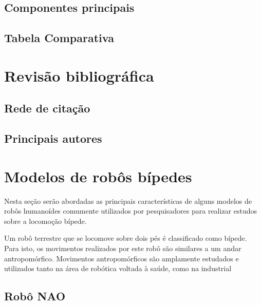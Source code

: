 \subsection{Componentes principais}
\label{ssec:comp}

\subsection{Tabela Comparativa}
\label{ssec:tabela}







\section{Revisão bibliográfica}
\label{sec:biblio}

\subsection{Rede de citação}
\label{ssec:rede}

\subsection{Principais autores}
\label{ssec:autor}


\section{Modelos de robôs bípedes}
\label{sec:modelos}

Nesta seção serão abordadas as principais características de alguns modelos de robôs humanoídes comumente utilizados por pesquisadores para realizar estudos sobre a locomoção bípede.

Um robô terrestre que se locomove sobre dois pés é classificado como bípede. Para isto, os movimentos realizados por este robô são similares a um andar antropomórfico. Movimentos antropomórficos são amplamente estudados e utilizados tanto na área de robótica voltada à saúde, como na industrial

\subsection{Robô NAO}
\label{ssec:nao}


